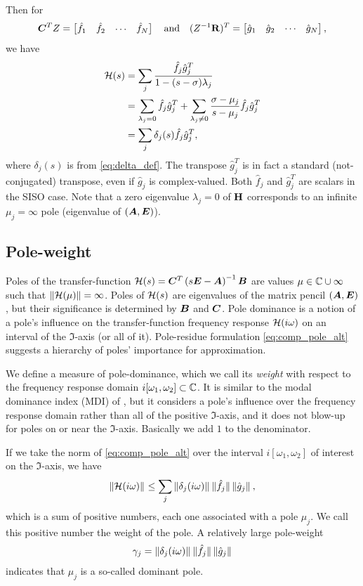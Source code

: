 Then for 
\[
\bm{C}^T Z = \begin{bmatrix} \hat{f}_1 & \hat{f}_2 &\cdots&\hat{f}_N\end{bmatrix} \quad\text{and}\quad
(Z^{-1}\textbf{\textup{R}})^T = \begin{bmatrix} \hat{g}_1 & \hat{g}_2 &\cdots&\hat{g}_N\end{bmatrix},
\]
we have
\begin{align}
\mathcal{H}(s) &= \sum_j \frac{\hat{f}_j\hat{g}_j^T}{1-(s-\sigma)\lambda_j} \label{eq:comp_eig_sum}\\
&= \sum_{\lambda_j=0} \hat{f}_j\hat{g}_j^T + \sum_{\lambda_j \neq 0} \frac{\sigma-\mu_j}{s-\mu_j}\hat{f}_j\hat{g}_j^T\nonumber\\
&= \sum_j \delta_j(s) \hat{f}_j \hat{g}_j^T,\label{eq:comp_pole_alt} 
\end{align}
where $\delta_j(s)$ is from \eqref{eq:delta_def}. The transpose $\hat{g}_j^T$ is in fact a standard (not-conjugated) transpose, even if $\hat{g}_j$ is complex-valued.   Both  $\hat{f}_j$ and $\hat{g}_j^T$ are scalars in the SISO case.
Note that a zero eigenvalue $\lambda_j=0$ of $\textbf{\textup{H}}$ corresponds to an infinite $\mu_j=\infty$ pole (eigenvalue of $(\bm{A},\bm{E})$). 


\subsection{Pole-weight}\label{sec:pole_dominance}
Poles of the transfer-function $\mathcal{H}(s) = \bm{C}^T\left(s\bm{E}-\bm{A}\right)^{-1}\bm{B}$ are values $\mu\in\mathbb{C} \cup \infty$ such that $\|\mathcal{H}(\mu)\|=\infty$. Poles of $\mathcal{H}(s)$ are eigenvalues of the matrix pencil $(\bm{A},\bm{E})$, but their significance is determined by $\bm{B}$ and $\bm{C}$. Pole dominance is a notion of a pole's influence on the transfer-function frequency response $\mathcal{H}(i \omega)$ on an interval of the $\Im$-axis (or all of it).   
Pole-residue formulation  %
 \eqref{eq:comp_pole_alt} suggests a hierarchy of poles' importance for approximation.  

 We define a measure of pole-dominance, which we call its \emph{weight} with respect to the frequency response domain $i[\omega_1,\omega_2]\subset\mathbb{C}$.  It is similar to the modal dominance index (MDI) of \cite{Aguirre}, but it considers a pole's influence over the frequency response domain rather than all of the positive $\Im$-axis, and it does not blow-up for poles on or near the $\Im$-axis.  Basically we add $1$ to the denominator.    

 If we take the norm of \eqref{eq:comp_pole_alt} over the interval $i[\omega_1,\omega_2]$ of interest on the $\Im$-axis, we have 
\begin{equation}
\left\| \mathcal{H}(i\omega) \right\|_{} \leq  \sum_j \left\| \delta_j(i\omega) \right\|_{} \|\hat{f}_j\| \left\| \hat{g}_j \right\|_{},
\label{eq:system_mass}
\end{equation}
which is a sum of positive numbers, each one associated with a pole $\mu_j$.  We call this positive number the weight of the pole.  A relatively large pole-weight 
\begin{equation}
\gamma_j =  \left\| \delta_j(i\omega) \right\|_{} \|\hat{f}_j\| \left\| \hat{g}_j \right\|_{}
\label{eq:pole_weight}
\end{equation}
indicates that $\mu_j$ is a so-called dominant pole.   



